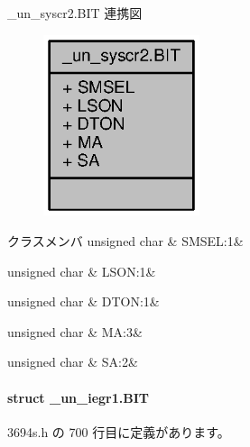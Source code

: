 \+\_\+un\+\_\+syscr2.\+B\+I\+T 連携図
\nopagebreak
\begin{figure}[H]
\begin{center}
\leavevmode
\includegraphics[width=130pt]{d6/d7b/struct__un__syscr2_8BIT__coll__graph}
\end{center}
\end{figure}
\begin{DoxyFields}{クラスメンバ}
unsigned char\label{3694s_8h_a1635bb5082d04d71f7d493c071f3a120}
&
S\+M\+S\+E\+L\+:1&
\\
\hline

unsigned char\label{3694s_8h_ac4740a587a9fda709be5ffd3c704ed88}
&
L\+S\+O\+N\+:1&
\\
\hline

unsigned char\label{3694s_8h_ad94a3345f1d15d5cede2167bf83a732d}
&
D\+T\+O\+N\+:1&
\\
\hline

unsigned char\label{3694s_8h_a2a6039655313bf5dab1e43523b62c374}
&
M\+A\+:3&
\\
\hline

unsigned char\label{3694s_8h_a3dd6b9265ff18f31dc30df59304b0ca7}
&
S\+A\+:2&
\\
\hline

\end{DoxyFields}
\label{struct__un__iegr1_8BIT}
\paragraph{struct \+\_\+un\+\_\+iegr1.\+B\+I\+T}


 3694s.\+h の 700 行目に定義があります。



